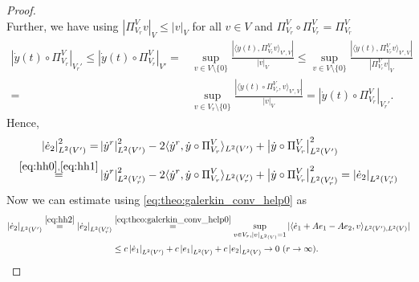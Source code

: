 \documentclass{m2an}
\newcommand{\norm}[2]{\left|#1\right|_{#2}}
\begin{document}
\begin{proof}
\begin{equation}
    \end{equation}
    Further, we have using $\norm{\Pi^V_{V_r}v }{V}\leq \norm{v}{V}$ for all $v\in V$ and $\Pi_{V_r}^V\circ \Pi_{V_r}^V= \Pi_{V_r}^V $
    \begin{align}\nonumber
       \norm{\dot y(t)\circ  \Pi_{V_r}^V}{V_r'} \leq \norm{\dot y(t)\circ  \Pi_{V_r}^V}{V'}=& \sup_{ v\in V\setminus\{0\}}\tfrac{| \langle \dot y(t), \Pi_{V_r}^Vv\rangle_{V',V}|}{\norm{v}{V}}\leq\sup_{ v\in V\setminus\{0\}}\tfrac{| \langle \dot y(t), \Pi_{V_r}^Vv\rangle_{V',V}|}{\norm{ \Pi_{V_r}^Vv}{V}}\\
        =&\sup_{ v\in V_r\setminus\{0\}}\tfrac{| \langle \dot y(t)\circ  \Pi_{V_r}^V,v\rangle_{V',V}|}{\norm{v}{V}}= \norm{\dot y(t)\circ \Pi_{V_r}^V}{V_r'}.\label{eq:hh1}
    \end{align}
    Hence,
    \begin{align}\nonumber
        \norm{\dot e_2}{L^2(V')}^2 =& \norm{\dot y^r}{L^2(V')}^2-2\langle \dot y^r,  \dot y\circ  \Pi_{V_r}^V \rangle_{L^2(V')}+\norm{\dot y\circ  \Pi_{V_r}^V}{L^2(V')}^2\\
        \stackrel{\eqref{eq:hh0},\eqref{eq:hh1}}{=}&\norm{\dot y^r}{L^2(V_r')}^2-2\langle \dot y^r,  \dot y\circ  \Pi_{V_r}^V \rangle_{L^2(V_r')}+\norm{\dot y\circ \Pi_{V_r}^V}{L^2(V_r')}^2=\norm{\dot e_2}{L^2(V_r')}\label{eq:hh2}
    \end{align}
    Now we can estimate using \eqref{eq:theo:galerkin_conv_help0} as
    \begin{align*}
         \norm{\dot e_2}{L^2(V')}\stackrel{\eqref{eq:hh2}}{=} \norm{\dot e_2}{L^2(V_r')}
         &\stackrel{\eqref{eq:theo:galerkin_conv_help0}}{=}\sup_{v\in V_r, \norm{v}{L^2(V)}=1}|\langle \dot e_1+Ae_1-Ae_2,v \rangle_{L^2(V'),L^2(V)}|\\
         & \leq c \norm{\dot e_1}{L^2(V')}+ c\norm{e_1}{L^2(V)}+c\norm{e_2}{L^2(V)}\to 0 \ (r\to \infty).
    \end{align*}
\end{proof}
%
%
\end{document}
